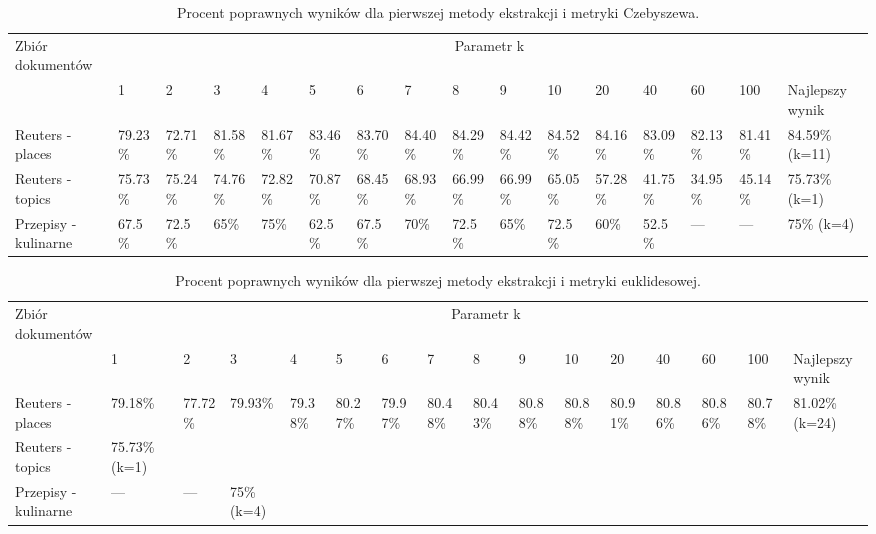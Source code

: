 \documentclass{classrep}
\begin{document}
\begingroup
{\scriptsize  
\setlength{\LTleft}{-20cm plus -1fill}
\setlength{\LTright}{\LTleft}

\begin{longtable}{|p{1cm}|p{0.7cm}|p{0.7cm}|p{0.7cm}|p{0.7cm}|p{0.7cm}|p{0.7cm}|p{0.7cm}|p{0.7cm}|p{0.7cm}|p{0.7cm}|p{0.7cm}|p{0.7cm}|p{0.7cm}|p{0.7cm}|p{1.1cm}|}
\caption{ Procent poprawnych wyników dla pierwszej metody ekstrakcji i metryki Czebyszewa.}\\ 
\hline

Zbiór
dokumentów

 &\multicolumn{15}{c|}{Parametr k}\\
\cline{2-16}
& 1
& 2
& 3
& 4
& 5
& 6
& 7
& 8
& 9
& 10
& 20
& 40
& 60
& 100
& Najlepszy wynik
\\ \hline\hline
Reuters
- places
& 79.23\%	%
& 72.71\%	%
& 81.58\%	%
& 81.67\%	%
& 83.46\%	%
& 83.70\%	%
& 84.40\%	%
& 84.29\%	%
& 84.42\%	%
& 84.52\%	%
& 84.16\%	%
& 83.09\%	%
& 82.13\%	%
& 81.41\%	%
& 84.59\% (k=11)
\\ \hline
Reuters
- topics
& 75.73\%	%
& 75.24\%	%
& 74.76\%	%
& 72.82\%	%
& 70.87\%	%
& 68.45\%	%
& 68.93\%	%
& 66.99\%	%
& 66.99\%	%
& 65.05\%	%
& 57.28\%	%
& 41.75\%	%
& 34.95\%	%
& 45.14\%	%
& 75.73\%	(k=1)
\\ \hline
Przepisy
- kulinarne 
& 67.5\%	%
& 72.5\%	%
& 65\%		%
& 75\%		%
& 62.5\%	%
& 67.5\%	%
& 70\%		%
& 72.5\%	%
& 65\%		%
& 72.5\%	%
& 60\%		%
& 52.5\%	%
& ---		%
& ---		%
& 75\% (k=4)
\\ \hline
\end{longtable}
}
\endgroup





\begingroup
{\scriptsize  
\setlength{\LTleft}{-20cm plus -1fill}
\setlength{\LTright}{\LTleft}

\begin{longtable}{|p{1cm}|p{0.7cm}|p{0.7cm}|p{0.7cm}|p{0.7cm}|p{0.7cm}|p{0.7cm}|p{0.7cm}|p{0.7cm}|p{0.7cm}|p{0.7cm}|p{0.7cm}|p{0.7cm}|p{0.7cm}|p{0.7cm}|p{1.1cm}|}
\caption{ Procent poprawnych wyników dla pierwszej metody ekstrakcji i metryki euklidesowej.}\\ 
\hline

Zbiór
dokumentów

 &\multicolumn{15}{c|}{Parametr k}\\
\cline{2-16}
& 1
& 2
& 3
& 4
& 5
& 6
& 7
& 8
& 9
& 10
& 20
& 40
& 60
& 100
& Najlepszy wynik
\\ \hline\hline
Reuters
- places
& 79.18\%	%
& 77.72\%	%
& 79.93\%	%
& 79.38\%	%
& 80.27\%	%
& 79.97\%	%
& 80.48\%	%
& 80.43\%	%
& 80.88\%	%
& 80.88\%	%
& 80.91\%	%
& 80.86\%	%
& 80.86\%	%
& 80.78\%	%
& 81.02\% (k=24)

\\ \hline
Reuters
- topics
& 75.73\%	(k=1)
\\ \hline
Przepisy
- kulinarne 

& ---		%
& ---		%
& 75\% (k=4)
\\ \hline
\end{longtable}
}
\endgroup
\end{document}
